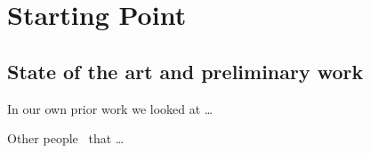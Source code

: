 \section{Starting Point}
\label{sec:work-report}

\subsection{State of the art and preliminary work}



In our own prior work \cite{schneider21:_divid_conquer} we looked at \dots 


Other people~\cite{Gerst:18} that \ldots 


\lipsum[1]



